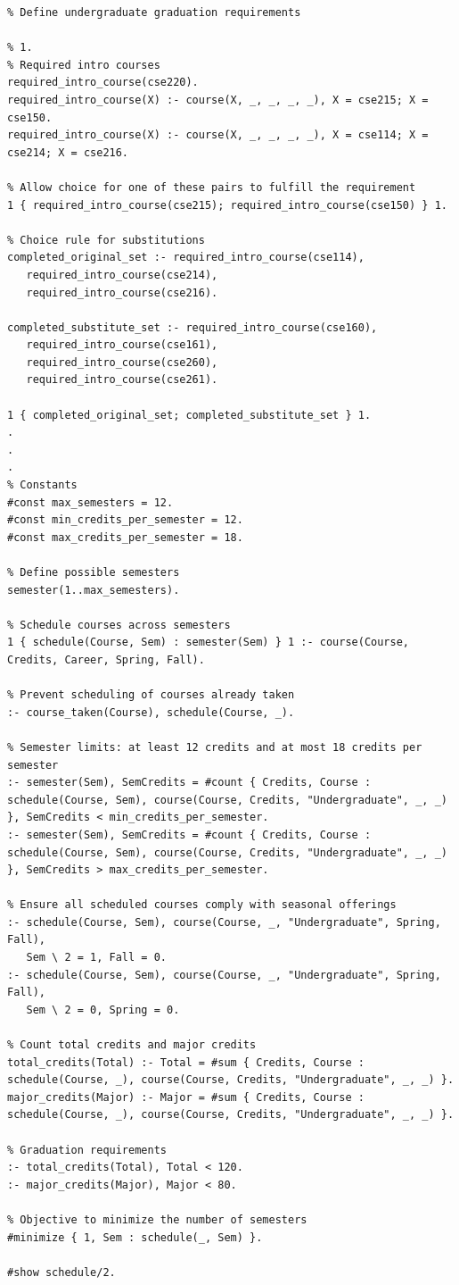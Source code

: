 \documentclass[12pt]{article}
\begin{document}
    \begin{lstlisting}
% Define undergraduate graduation requirements

% 1.
% Required intro courses
required_intro_course(cse220).
required_intro_course(X) :- course(X, _, _, _, _), X = cse215; X = cse150.
required_intro_course(X) :- course(X, _, _, _, _), X = cse114; X = cse214; X = cse216.

% Allow choice for one of these pairs to fulfill the requirement
1 { required_intro_course(cse215); required_intro_course(cse150) } 1.

% Choice rule for substitutions
completed_original_set :- required_intro_course(cse114), 
   required_intro_course(cse214), 
   required_intro_course(cse216).

completed_substitute_set :- required_intro_course(cse160), 
   required_intro_course(cse161), 
   required_intro_course(cse260), 
   required_intro_course(cse261).

1 { completed_original_set; completed_substitute_set } 1.
.
.
.
% Constants
#const max_semesters = 12.
#const min_credits_per_semester = 12.
#const max_credits_per_semester = 18.

% Define possible semesters
semester(1..max_semesters).

% Schedule courses across semesters
1 { schedule(Course, Sem) : semester(Sem) } 1 :- course(Course, Credits, Career, Spring, Fall).

% Prevent scheduling of courses already taken
:- course_taken(Course), schedule(Course, _).

% Semester limits: at least 12 credits and at most 18 credits per semester
:- semester(Sem), SemCredits = #count { Credits, Course : schedule(Course, Sem), course(Course, Credits, "Undergraduate", _, _) }, SemCredits < min_credits_per_semester.
:- semester(Sem), SemCredits = #count { Credits, Course : schedule(Course, Sem), course(Course, Credits, "Undergraduate", _, _) }, SemCredits > max_credits_per_semester.

% Ensure all scheduled courses comply with seasonal offerings
:- schedule(Course, Sem), course(Course, _, "Undergraduate", Spring, Fall), 
   Sem \ 2 = 1, Fall = 0.
:- schedule(Course, Sem), course(Course, _, "Undergraduate", Spring, Fall), 
   Sem \ 2 = 0, Spring = 0.

% Count total credits and major credits
total_credits(Total) :- Total = #sum { Credits, Course : schedule(Course, _), course(Course, Credits, "Undergraduate", _, _) }.
major_credits(Major) :- Major = #sum { Credits, Course : schedule(Course, _), course(Course, Credits, "Undergraduate", _, _) }.

% Graduation requirements
:- total_credits(Total), Total < 120.
:- major_credits(Major), Major < 80.

% Objective to minimize the number of semesters
#minimize { 1, Sem : schedule(_, Sem) }.

#show schedule/2.
    \end{lstlisting}
\end{document}
